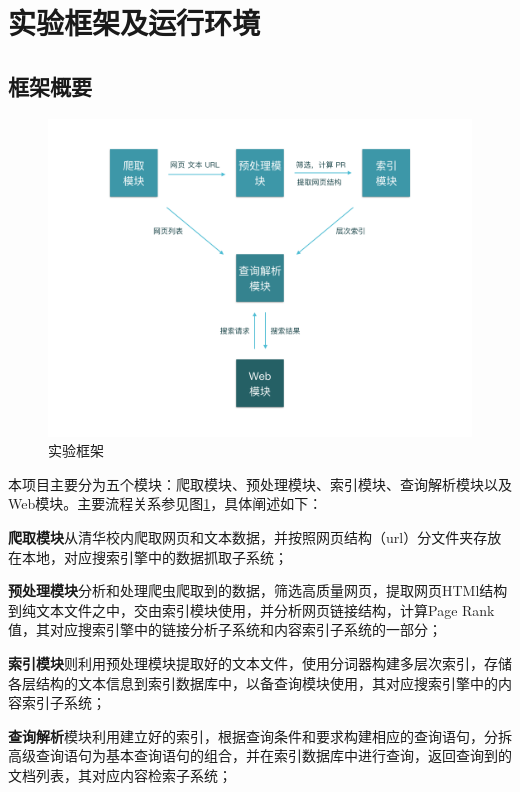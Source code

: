 \documentclass[paper=a4, fontsize=11pt, UTF8]{article} %
\numberwithin{equation}{section} %
\numberwithin{figure}{section} %
\numberwithin{table}{section} %
\begin{document}
\section{实验框架及运行环境}

\subsection{框架概要}

\begin{figure}[htp]
\center
\includegraphics[width=\textwidth]{arch}
\caption{实验框架} \label{relation}
\end{figure}

本项目主要分为五个模块：爬取模块、预处理模块、索引模块、查询解析模块以及Web模块。主要流程关系参见图\ref{relation}，具体阐述如下：

\textbf{爬取模块}从清华校内爬取网页和文本数据，并按照网页结构（url）分文件夹存放在本地，对应搜索引擎中的数据抓取子系统；

\textbf{预处理模块}分析和处理爬虫爬取到的数据，筛选高质量网页，提取网页HTMl结构到纯文本文件之中，交由索引模块使用，并分析网页链接结构，计算Page Rank值，其对应搜索引擎中的链接分析子系统和内容索引子系统的一部分；

\textbf{索引模块}则利用预处理模块提取好的文本文件，使用分词器构建多层次索引，存储各层结构的文本信息到索引数据库中，以备查询模块使用，其对应搜索引擎中的内容索引子系统；

\textbf{查询解析}模块利用建立好的索引，根据查询条件和要求构建相应的查询语句，分拆高级查询语句为基本查询语句的组合，并在索引数据库中进行查询，返回查询到的文档列表，其对应内容检索子系统；
\end{document}
